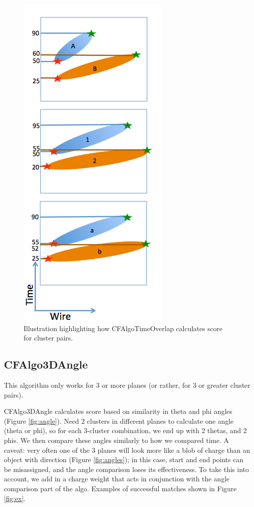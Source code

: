 \documentclass{article}
\begin{document}
\begin{figure}[!h]
\begin{center}
\includegraphics[scale=0.5]{Figures/MatchAlgo_CFAlgoTimeOverlap_Description.png}
\end{center}
\caption{Illustration highlighting how CFAlgoTimeOverlap calculates score for cluster pairs.  }
\label{fig:time}
\end{figure}


\newpage

\subsection{CFAlgo3DAngle}
This algorithm only works for 3 or more planes (or rather, for 3 or greater cluster pairs).  
\par CFAlgo3DAngle calculates score based on similarity in theta and phi angles (Figure \ref{fig:angle}). Need 2 clusters in different planes to calculate one angle (theta or phi), so for each 3-cluster combination, we end up with 2 thetas, and 2 phis.  We then compare these angles similarly to how we compared time.  A caveat: very often one of the 3 planes will look more like a blob of charge than an object with direction (Figure \ref{fig:angles}); in this case, start and end points can be misassigned, and the angle comparison loses its effectiveness.  To take this into account, we add in a charge weight that acts in conjunction with the angle comparison part of the algo. Examples of successful matches shown in Figure \ref{fig:ex}.   
\end{document}

